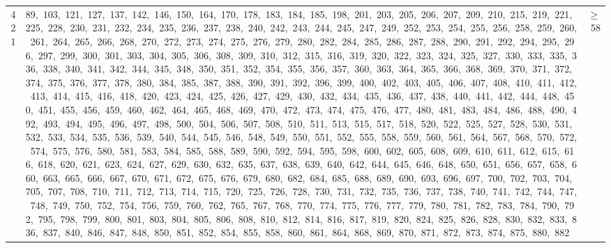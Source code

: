 \begin{longtable}{c|p{}|r}
421 & 89,\ 103,\ 121,\ 127,\ 137,\ 142,\ 146,\ 150,\ 164,\ 170,\ 178,\ 183,\ 184,\ 185,\ 198,\ 201,\ 203,\ 205,\ 206,\ 207,\ 209,\ 210,\ 215,\ 219,\ 221,\ 225,\ 228,\ 230,\ 231,\ 232,\ 234,\ 235,\ 236,\ 237,\ 238,\ 240,\ 242,\ 243,\ 244,\ 245,\ 247,\ 249,\ 252,\ 253,\ 254,\ 255,\ 256,\ 258,\ 259,\ 260,\ 261,\ 264,\ 265,\ 266,\ 268,\ 270,\ 272,\ 273,\ 274,\ 275,\ 276,\ 279,\ 280,\ 282,\ 284,\ 285,\ 286,\ 287,\ 288,\ 290,\ 291,\ 292,\ 294,\ 295,\ 296,\ 297,\ 299,\ 300,\ 301,\ 303,\ 304,\ 305,\ 306,\ 308,\ 309,\ 310,\ 312,\ 315,\ 316,\ 319,\ 320,\ 322,\ 323,\ 324,\ 325,\ 327,\ 330,\ 333,\ 335,\ 336,\ 338,\ 340,\ 341,\ 342,\ 344,\ 345,\ 348,\ 350,\ 351,\ 352,\ 354,\ 355,\ 356,\ 357,\ 360,\ 363,\ 364,\ 365,\ 366,\ 368,\ 369,\ 370,\ 371,\ 372,\ 374,\ 375,\ 376,\ 377,\ 378,\ 380,\ 384,\ 385,\ 387,\ 388,\ 390,\ 391,\ 392,\ 396,\ 399,\ 400,\ 402,\ 403,\ 405,\ 406,\ 407,\ 408,\ 410,\ 411,\ 412,\ 413,\ 414,\ 415,\ 416,\ 418,\ 420,\ 423,\ 424,\ 425,\ 426,\ 427,\ 429,\ 430,\ 432,\ 434,\ 435,\ 436,\ 437,\ 438,\ 440,\ 441,\ 442,\ 444,\ 448,\ 450,\ 451,\ 455,\ 456,\ 459,\ 460,\ 462,\ 464,\ 465,\ 468,\ 469,\ 470,\ 472,\ 473,\ 474,\ 475,\ 476,\ 477,\ 480,\ 481,\ 483,\ 484,\ 486,\ 488,\ 490,\ 492,\ 493,\ 494,\ 495,\ 496,\ 497,\ 498,\ 500,\ 504,\ 506,\ 507,\ 508,\ 510,\ 511,\ 513,\ 515,\ 517,\ 518,\ 520,\ 522,\ 525,\ 527,\ 528,\ 530,\ 531,\ 532,\ 533,\ 534,\ 535,\ 536,\ 539,\ 540,\ 544,\ 545,\ 546,\ 548,\ 549,\ 550,\ 551,\ 552,\ 555,\ 558,\ 559,\ 560,\ 561,\ 564,\ 567,\ 568,\ 570,\ 572,\ 574,\ 575,\ 576,\ 580,\ 581,\ 583,\ 584,\ 585,\ 588,\ 589,\ 590,\ 592,\ 594,\ 595,\ 598,\ 600,\ 602,\ 605,\ 608,\ 609,\ 610,\ 611,\ 612,\ 615,\ 616,\ 618,\ 620,\ 621,\ 623,\ 624,\ 627,\ 629,\ 630,\ 632,\ 635,\ 637,\ 638,\ 639,\ 640,\ 642,\ 644,\ 645,\ 646,\ 648,\ 650,\ 651,\ 656,\ 657,\ 658,\ 660,\ 663,\ 665,\ 666,\ 667,\ 670,\ 671,\ 672,\ 675,\ 676,\ 679,\ 680,\ 682,\ 684,\ 685,\ 688,\ 689,\ 690,\ 693,\ 696,\ 697,\ 700,\ 702,\ 703,\ 704,\ 705,\ 707,\ 708,\ 710,\ 711,\ 712,\ 713,\ 714,\ 715,\ 720,\ 725,\ 726,\ 728,\ 730,\ 731,\ 732,\ 735,\ 736,\ 737,\ 738,\ 740,\ 741,\ 742,\ 744,\ 747,\ 748,\ 749,\ 750,\ 752,\ 754,\ 756,\ 759,\ 760,\ 762,\ 765,\ 767,\ 768,\ 770,\ 774,\ 775,\ 776,\ 777,\ 779,\ 780,\ 781,\ 782,\ 783,\ 784,\ 790,\ 792,\ 795,\ 798,\ 799,\ 800,\ 801,\ 803,\ 804,\ 805,\ 806,\ 808,\ 810,\ 812,\ 814,\ 816,\ 817,\ 819,\ 820,\ 824,\ 825,\ 826,\ 828,\ 830,\ 832,\ 833,\ 836,\ 837,\ 840,\ 846,\ 847,\ 848,\ 850,\ 851,\ 852,\ 854,\ 855,\ 858,\ 860,\ 861,\ 864,\ 868,\ 869,\ 870,\ 871,\ 872,\ 873,\ 874,\ 875,\ 880,\ 882 & $\ge$ 58 \\

\end{longtable}
